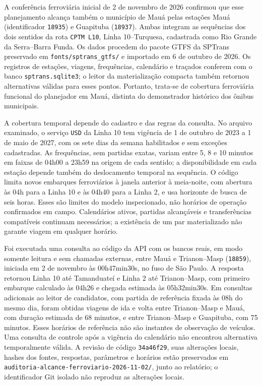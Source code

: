 \documentclass[12pt,oneside,a4paper,brazil,chapter=TITLE]{abntex2}
\begin{document}
A conferência ferroviária inicial de 2 de novembro de 2026 confirmou que esse planejamento alcança também o município de Mauá pelas estações Mauá (identificador \texttt{18935}) e Guapituba (\texttt{18937}). Ambas integram as sequências dos dois sentidos da rota \texttt{CPTM L10}, Linha 10--Turquesa, cadastrada como Rio Grande da Serra--Barra Funda. Os dados procedem do pacote GTFS da SPTrans preservado em \nolinkurl{fonts/sptrans_gtfs/} e importado em 6 de outubro de 2026. Os registros de estações, viagens, frequências, calendário e traçados conferem com o banco \nolinkurl{sptrans.sqlite3}; o leitor da materialização compacta também retornou alternativas válidas para esses pontos. Portanto, trata-se de cobertura ferroviária funcional do planejador em Mauá, distinta do demonstrador histórico dos ônibus municipais.

A cobertura temporal depende do cadastro e das regras da consulta. No arquivo examinado, o serviço \texttt{USD} da Linha 10 tem vigência de 1 de outubro de 2023 a 1 de maio de 2027, com os sete dias da semana habilitados e sem exceções cadastradas. As frequências, sem partidas exatas, variam entre 5, 8 e 10 minutos em faixas de 04h00 a 23h59 na origem de cada sentido; a disponibilidade em cada estação depende também do deslocamento temporal na sequência. O código limita novos embarques ferroviários à janela anterior à meia-noite, com abertura às 04h para a Linha 10 e às 04h40 para a Linha 2, e usa horizonte de busca de seis horas. Esses são limites do modelo inspecionado, não horários de operação confirmados em campo. Calendários ativos, partidas alcançáveis e transferências compatíveis continuam necessários; a existência de um par materializado não garante viagem em qualquer horário.

Foi executada uma consulta ao código da API com os bancos reais, em modo somente leitura e sem chamadas externas, entre Mauá e Trianon--Masp (\texttt{18859}), iniciada em 2 de novembro às 00h47min30s, no fuso de São Paulo. A resposta retornou Linha 10 até Tamanduateí e Linha 2 até Trianon--Masp, com primeiro embarque calculado às 04h26 e chegada estimada às 05h32min30s. Em consultas adicionais ao leitor de candidatos, com partida de referência fixada às 08h do mesmo dia, foram obtidas viagens de ida e volta entre Trianon--Masp e Mauá, com duração estimada de 68 minutos, e entre Trianon--Masp e Guapituba, com 75 minutos. Esses horários de referência não são instantes de observação de veículos. Uma consulta de controle após a vigência do calendário não encontrou alternativa temporalmente válida. A revisão de código \texttt{34a46f29}, suas alterações locais, hashes dos fontes, respostas, parâmetros e horários estão preservados em \nolinkurl{auditoria-alcance-ferroviario-2026-11-02/}, junto ao relatório; o identificador Git isolado não reproduz as alterações locais.
\end{document}
